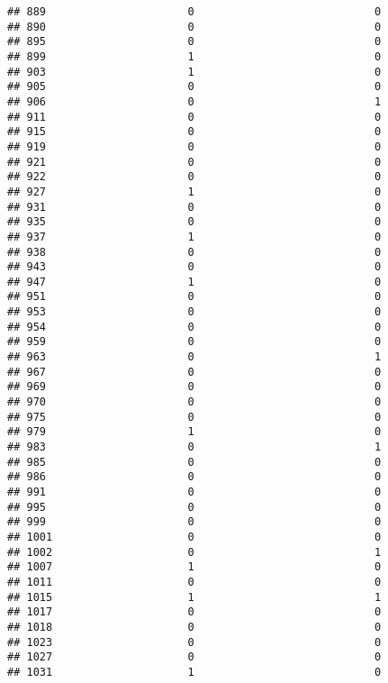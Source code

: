 \documentclass[
]{article}
\begin{document}
\begin{verbatim}
## 889                      0                            0
## 890                      0                            0
## 895                      0                            0
## 899                      1                            0
## 903                      1                            0
## 905                      0                            0
## 906                      0                            1
## 911                      0                            0
## 915                      0                            0
## 919                      0                            0
## 921                      0                            0
## 922                      0                            0
## 927                      1                            0
## 931                      0                            0
## 935                      0                            0
## 937                      1                            0
## 938                      0                            0
## 943                      0                            0
## 947                      1                            0
## 951                      0                            0
## 953                      0                            0
## 954                      0                            0
## 959                      0                            0
## 963                      0                            1
## 967                      0                            0
## 969                      0                            0
## 970                      0                            0
## 975                      0                            0
## 979                      1                            0
## 983                      0                            1
## 985                      0                            0
## 986                      0                            0
## 991                      0                            0
## 995                      0                            0
## 999                      0                            0
## 1001                     0                            0
## 1002                     0                            1
## 1007                     1                            0
## 1011                     0                            0
## 1015                     1                            1
## 1017                     0                            0
## 1018                     0                            0
## 1023                     0                            0
## 1027                     0                            0
## 1031                     1                            0

\end{verbatim}
\end{document}
